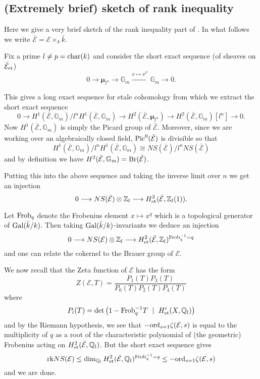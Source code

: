 \documentclass[12pt]{amsart}
\numberwithin{equation}{section}
\theoremstyle{remark}
\theoremstyle{definition}
\theoremstyle{definition}
\theoremstyle{definition}
\theoremstyle{definition}
\theoremstyle{definition}
\theoremstyle{definition}
\theoremstyle{definition}
\begin{document}
\subsection{(Extremely brief) sketch of  rank inequality}

Here we give a very brief sketch of the rank inequality part of . In what follows we write $\bar{\mathcal{E}}=\mathcal{E}\times_{k} \bar{k}$.

Fix a prime $l\neq p=\textup{char}(k)$ and consider the short exact sequence (of sheaves on $\bar{\mathcal{E}}_\textup{et}$)
\[0\longrightarrow \boldsymbol \mu_{l^n} \longrightarrow \mathbb{G}_m \stackrel{x\mapsto x^{l^n}}{\longrightarrow} \mathbb{G}_m \longrightarrow 0.\]

This gives a long exact sequence for etale cohomology from which we extract the short exact sequence
\[0 \longrightarrow H^1(\bar{\mathcal{E}},\mathbb{G}_m)/l^nH^1(\bar{\mathcal{E}},\mathbb{G}_m) \longrightarrow H^2(\bar{\mathcal{E}}, \boldsymbol \mu_{l^n})\longrightarrow H^2(\bar{\mathcal{E}},\mathbb{G}_m)[l^n]\longrightarrow 0.\]
Now $H^1(\bar{\mathcal{E}},\mathbb{G}_m)$ is simply the Picard group of $\bar{\mathcal{E}}$. Moreover, since we are working over an algebraically closed field, $\textup{Pic}^0(\bar{\mathcal{E}})$ is divisible so that 
\[H^1(\bar{\mathcal{E}},\mathbb{G}_m)/l^nH^1(\bar{\mathcal{E}},\mathbb{G}_m) \cong NS(\bar{\mathcal{E}})/l^n NS(\bar{\mathcal{E}}) \]
and by definition we have $H^2(\bar{\mathcal{E}},\mathbb{G}_m)=\textup{Br}(\bar{\mathcal{E}})$. 

Putting this into the above sequence and taking the inverse limit over $n$ we get an injection
\[0 \longrightarrow NS(\bar{\mathcal{E}})\otimes \mathbb{Z}_l \longrightarrow H^2_{\textup{et}}(\bar{\mathcal{E}},\mathbb{Z}_l(1)).\]


Let $\textup{Frob}_q$ denote the Frobenius element $x\mapsto x^q$ which is a topological generator of $\textup{Gal}(\bar{k}/k)$. Then taking $\textup{Gal}(\bar{k}/k)$-invariants we deduce an injection
\[0 \longrightarrow NS(\mathcal{E})\otimes \mathbb{Z}_l \longrightarrow H^2_{\textup{et}}(\bar{\mathcal{E}},\mathbb{Z}_l)^{\textup{Frob}_q^{-1}=q}\]
and one can relate the cokernel to the Brauer group of $\mathcal{E}$. 

We now recall that the Zeta function of $\mathcal{E}$ has the form
\[Z(\mathcal{E},T)=\frac{P_1(T)P_3(T)}{P_0(T)P_2(T)P_4(T)}\]
where \[P_i(T)=\textup{det}\left(1-\textup{Frob}_q^{-1}T ~\mid~ H^i_{\textup{et}}(X,\mathbb{Q}_l)\right)\]
and by the Riemann hypothesis, we see that $-\textup{ord}_{s=1}\zeta(\mathcal{E},s)$ is equal to the multiplicity of $q$ as a root of the characteristic polynomial of (the geometric) Frobenius acting on $H^2_{\textup{et}}(\bar{\mathcal{E}},\mathbb{Q}_l)$. But the short exact sequence gives
\[\textup{rk}NS(\mathcal{E})\leq \dim_{\mathbb{Q}_l}H^2_{\textup{et}}(\bar{\mathcal{E}},\mathbb{Q}_l)^{\textup{Frob}_q^{-1}=q}\leq -\textup{ord}_{s=1}\zeta(\mathcal{E},s)\]
and we are done.
\end{document}
